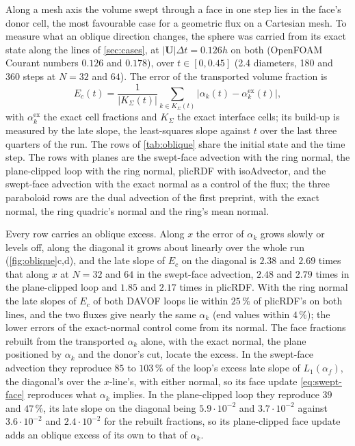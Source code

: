 \documentclass[preprint,12pt]{elsarticle}
\begin{document}


Along a mesh axis the volume swept through a face in one step lies in the face's donor cell, the most favourable case for a geometric flux on a Cartesian mesh. To measure what an oblique direction changes, the sphere was carried from its exact state along the lines of \cref{sec:cases}, at $|\mathbf{U}|\Delta t = 0.126h$ on both (OpenFOAM Courant numbers $0.126$ and $0.178$), over $t \in [0, 0.45]$ (2.4 diameters, 180 and 360 steps at $N = 32$ and $64$). The error of the transported volume fraction is
\begin{equation}
E_c(t) = \frac{1}{|K_\Sigma(t)|}\sum_{k \in K_\Sigma(t)} \big|\alpha_k(t) - \alpha_k^{\mathrm{ex}}(t)\big|,
\label{eq:Ec}
\end{equation}
with $\alpha_k^{\mathrm{ex}}$ the exact cell fractions and $K_\Sigma$ the exact interface cells; its build-up is measured by the late slope, the least-squares slope against $t$ over the last three quarters of the run. The rows of \cref{tab:oblique} share the initial state and the time step. The rows with planes are the swept-face advection with the ring normal, the plane-clipped loop with the ring normal, plicRDF with isoAdvector, and the swept-face advection with the exact normal as a control of the flux; the three paraboloid rows are the dual advection of the first preprint, with the exact normal, the ring quadric's normal and the ring's mean normal.

Every row carries an oblique excess. Along $x$ the error of $\alpha_k$ grows slowly or levels off, along the diagonal it grows about linearly over the whole run (\cref{fig:oblique}c,d), and the late slope of $E_c$ on the diagonal is $2.38$ and $2.69$ times that along $x$ at $N = 32$ and $64$ in the swept-face advection, $2.48$ and $2.79$ times in the plane-clipped loop and $1.85$ and $2.17$ times in plicRDF. With the ring normal the late slopes of $E_c$ of both DAVOF loops lie within $25\,\%$ of plicRDF's on both lines, and the two fluxes give nearly the same $\alpha_k$ (end values within $4\,\%$); the lower errors of the exact-normal control come from its normal. The face fractions rebuilt from the transported $\alpha_k$ alone, with the exact normal, the plane positioned by $\alpha_k$ and the donor's cut, locate the excess. In the swept-face advection they reproduce $85$ to $103\,\%$ of the loop's excess late slope of $L_1(\alpha_f)$, the diagonal's over the $x$-line's, with either normal, so its face update \cref{eq:swept-face} reproduces what $\alpha_k$ implies. In the plane-clipped loop they reproduce $39$ and $47\,\%$, its late slope on the diagonal being $5.9\cdot10^{-2}$ and $3.7\cdot10^{-2}$ against $3.6\cdot10^{-2}$ and $2.4\cdot10^{-2}$ for the rebuilt fractions, so its plane-clipped face update adds an oblique excess of its own to that of $\alpha_k$.
\end{document}
